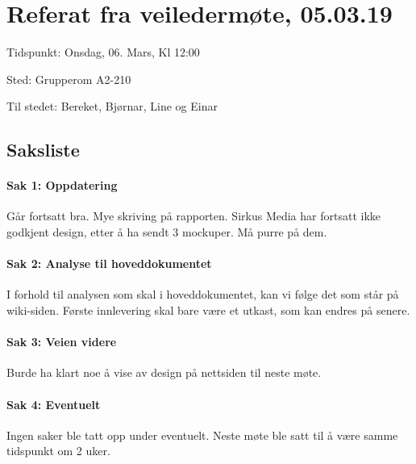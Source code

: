 \chapter{Referat fra veiledermøte, 05.03.19}

Tidspunkt: Onsdag, 06. Mars, Kl 12:00

Sted: Grupperom A2-210

Til stedet: Bereket, Bjørnar, Line og Einar

\section{Saksliste}

\subsubsection{Sak 1: Oppdatering}
Går fortsatt bra. Mye skriving på rapporten. Sirkus Media har fortsatt ikke godkjent design, etter å ha sendt 3 mockuper. Må purre på dem.

\subsubsection{Sak 2: Analyse til hoveddokumentet}
I forhold til analysen som skal i hoveddokumentet, kan vi følge det som står på wiki-siden. Første innlevering skal bare være et utkast, som kan endres på senere. 

\subsubsection{Sak 3: Veien videre}
Burde ha klart noe å vise av design på nettsiden til neste møte.

\subsubsection{Sak 4: Eventuelt}
Ingen saker ble tatt opp under eventuelt. Neste møte ble satt til å være samme tidspunkt om 2 uker.
